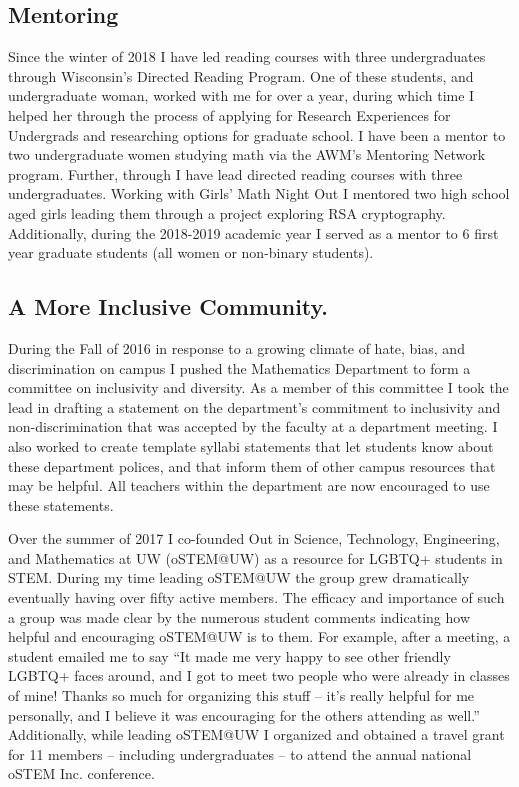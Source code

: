 \documentclass[10pt,reqno]{amsart}
\theoremstyle{remark}
\begin{document}
\subsection{Mentoring}
Since the winter of 2018 I have led reading courses with three undergraduates through Wisconsin's Directed Reading Program. One of these students, and undergraduate woman, worked with me for over a year, during which time I helped her through the process of applying for Research Experiences for Undergrads and researching options for graduate school. I have been a mentor to two undergraduate women studying math via the AWM's Mentoring Network program. Further, through I have lead directed reading courses with three undergraduates. Working with Girls' Math Night Out I mentored two high school aged girls leading them through a project exploring RSA cryptography. Additionally, during the 2018-2019 academic year I served as a mentor to 6 first year graduate students (all women or non-binary students). 


\subsection{A More Inclusive Community.} During the Fall of 2016 in response to a growing climate of hate, bias, and discrimination on campus I pushed the Mathematics Department to form a committee on inclusivity and diversity. As a member of this committee I took the lead in drafting a statement on the department's commitment to inclusivity and non-discrimination that was  accepted by the faculty at a department meeting. I also worked to create template syllabi statements that let students know about these department polices, and that inform them of other campus resources that may be helpful. All teachers within the department are now encouraged to use these statements. 

Over the summer of 2017 I co-founded Out in Science, Technology, Engineering, and Mathematics at UW (oSTEM@UW) as a resource for LGBTQ+ students in STEM. During my time leading oSTEM@UW the group grew dramatically eventually having over fifty active members. The efficacy and importance of such a group was made clear by the numerous student comments indicating how helpful and encouraging oSTEM@UW is to them. For example, after a meeting, a student emailed me to say ``It made me very happy to see other friendly LGBTQ+ faces around, and I got to meet two people who were already in classes of mine! Thanks so much for organizing this stuff -- it's really helpful for me personally, and I believe it was encouraging for the others attending as well.'' Additionally, while leading oSTEM@UW I organized and obtained a travel grant for 11 members -- including undergraduates -- to attend the annual national oSTEM Inc. conference. 
\end{document}
